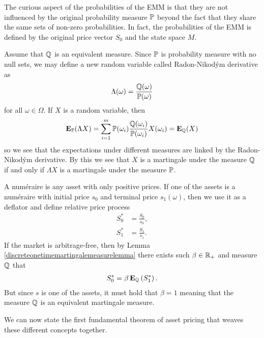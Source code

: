 The curious aspect of the probabilities of the EMM is that they are not influenced by the original probability measure $\mathbb{P}$ beyond the fact that they share the same sets of non-zero probabilities. In fact, the probabilities of the EMM is defined by the original price vector $S_0$ and the state space $M$.

Assume that $\mathbb{Q}$ is an equivalent measure. Since $\mathbb{P}$ is probability measure with no null sets, we may define a new random variable called Radon-Nikod\'{y}m derivative as
\begin{align}
\Lambda ( \omega ) = \frac{ \mathbb{Q} ( \omega ) }{ \mathbb{P} ( \omega ) } 
\end{align}
for all $\omega \in \Omega$. If $X$ is a random variable, then
\begin{align}
\operatorname{\boldsymbol{\mathrm{E}}}_{\mathbb{P}} (\Lambda X) = \sum_{i=1}^m \mathbb{P} (\omega_i) \frac{ \mathbb{Q} ( \omega_i ) }{ \mathbb{P} ( \omega_i ) } X( \omega_i ) = \operatorname{\boldsymbol{\mathrm{E}}}_{\mathbb{Q}} (X) 
\end{align}
so we see that the expectations under different measures are linked by the Radon-Nikod\'{y}m derivative. By this we see that $X$ is a martingale under the measure $\mathbb{Q}$ if and only if $\Lambda X$ is a martingale under the measure $\mathbb{P}$.

A num\'{e}raire is any asset with only positive prices. If one of the assets is a num\'{e}raire with initial price $s_0$ and terminal price $s_1( \omega )$, then we use it as a deflator and define relative price process
  \begin{align}
    S_0^* &= \frac{S_0}{s_0}, \\
    S_1^* &= \frac{S_1}{s_1}.
  \end{align}
If the market is arbitrage-free, then by Lemma \ref{discreteonetimemartingalemeasurelemma} there exists such $\beta \in \mathbb{R}_+$ and measure $\mathbb{Q}$ that 
\begin{align}
S^*_0 = \beta \operatorname{\boldsymbol{\mathrm{E}}}_{\mathbb{Q}} \left( S^*_1 \right) .
\end{align}
But since $s$ is one of the assets, it must hold that $\beta = 1$ meaning that the measure $\mathbb{Q}$ is an equivalent martingale measure.

We can now state the first fundamental theorem of asset pricing that weaves these different concepts together.


